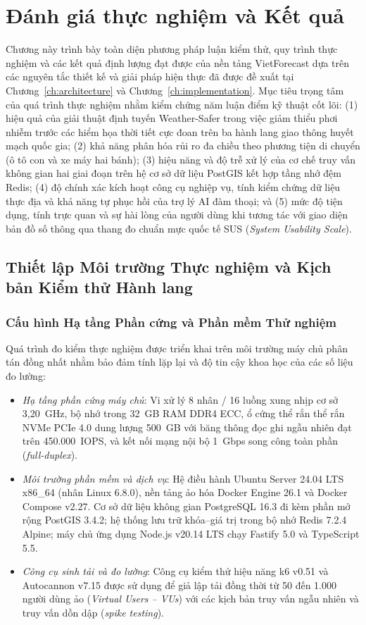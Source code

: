 \chapter{Đánh giá thực nghiệm và Kết quả}
\label{ch:evaluation}

Chương này trình bày toàn diện phương pháp luận kiểm thử, quy trình thực nghiệm và các kết quả định lượng đạt được của nền tảng VietForecast dựa trên các nguyên tắc thiết kế và giải pháp hiện thực đã được đề xuất tại Chương~\ref{ch:architecture} và Chương~\ref{ch:implementation}. Mục tiêu trọng tâm của quá trình thực nghiệm nhằm kiểm chứng năm luận điểm kỹ thuật cốt lõi: (1) hiệu quả của giải thuật định tuyến Weather-Safer trong việc giảm thiểu phơi nhiễm trước các hiểm họa thời tiết cực đoan trên ba hành lang giao thông huyết mạch quốc gia; (2) khả năng phân hóa rủi ro đa chiều theo phương tiện di chuyển (ô tô con và xe máy hai bánh); (3) hiệu năng và độ trễ xử lý của cơ chế truy vấn không gian hai giai đoạn trên hệ cơ sở dữ liệu PostGIS kết hợp tầng nhớ đệm Redis; (4) độ chính xác kích hoạt công cụ nghiệp vụ, tính kiểm chứng dữ liệu thực địa và khả năng tự phục hồi của trợ lý AI đàm thoại; và (5) mức độ tiện dụng, tính trực quan và sự hài lòng của người dùng khi tương tác với giao diện bản đồ số thông qua thang đo chuẩn mực quốc tế SUS (\textit{System Usability Scale}).

\section{Thiết lập Môi trường Thực nghiệm và Kịch bản Kiểm thử Hành lang}
\label{sec:experimental_setup}

\subsection{Cấu hình Hạ tầng Phần cứng và Phần mềm Thử nghiệm}
Quá trình đo kiểm thực nghiệm được triển khai trên môi trường máy chủ phân tán đồng nhất nhằm bảo đảm tính lặp lại và độ tin cậy khoa học của các số liệu đo lường:
\begin{itemize}
    \item[-] \textit{Hạ tầng phần cứng máy chủ}: Vi xử lý 8 nhân / 16 luồng xung nhịp cơ sở 3,20~GHz, bộ nhớ trong 32~GB RAM DDR4 ECC, ổ cứng thể rắn thể rắn NVMe PCIe 4.0 dung lượng 500~GB với băng thông đọc ghi ngẫu nhiên đạt trên 450.000~IOPS, và kết nối mạng nội bộ 1~Gbps song công toàn phần (\textit{full-duplex}).
    \item[-] \textit{Môi trường phần mềm và dịch vụ}: Hệ điều hành Ubuntu Server 24.04 LTS x86\_64 (nhân Linux 6.8.0), nền tảng ảo hóa Docker Engine 26.1 và Docker Compose v2.27. Cơ sở dữ liệu không gian PostgreSQL 16.3 đi kèm phần mở rộng PostGIS 3.4.2; hệ thống lưu trữ khóa--giá trị trong bộ nhớ Redis 7.2.4 Alpine; máy chủ ứng dụng Node.js v20.14 LTS chạy Fastify 5.0 và TypeScript 5.5.
    \item[-] \textit{Công cụ sinh tải và đo lường}: Công cụ kiểm thử hiệu năng k6 v0.51 và Autocannon v7.15 được sử dụng để giả lập tải đồng thời từ 50 đến 1.000 người dùng ảo (\textit{Virtual Users -- VUs}) với các kịch bản truy vấn ngẫu nhiên và truy vấn dồn dập (\textit{spike testing}).
\end{itemize}

